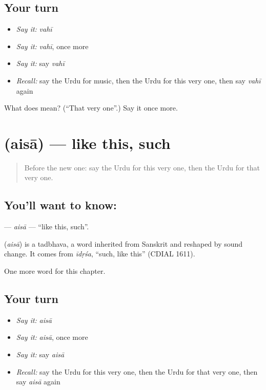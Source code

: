 \subsection*{Your turn}
\begin{itemize}
\raggedright
  \item \emph{Say it:} \emph{vahī}
  \item \emph{Say it:} \emph{vahī}, once more
  \item \emph{Say it:} say \emph{vahī}
  \item \emph{Recall:} say the Urdu for music, then the Urdu for this very one, then say \emph{vahī} again
\end{itemize}

\begin{tcolorbox}[breakable,colback=teal!4,colframe=teal!35!black,title={Before you move on}]
What does  mean? (\textquotedblleft{}That very one\textquotedblright{}.) Say it once more.
\end{tcolorbox}
\section[\texorpdfstring{\ur{ایسا} (aisā)}{ایسا (aisā)}]{ (aisā) — like this, such}

\label{lesson:UR-C88-aisa}



\begin{quote}
Before the new one: say the Urdu for this very one, then the Urdu for that very one.
\end{quote}

\subsection*{You'll want to know: }
\textbf{} — \emph{aisā} — \textquotedblleft{}like this, such\textquotedblright{}.

\begin{cousinweb}
\textbf{} (\emph{aisā}) is a tadbhava, a word inherited from Sanskrit and reshaped by sound change. It comes from \emph{īdṛśa}, \textquotedblleft{}such, like this\textquotedblright{} (CDIAL 1611).
\end{cousinweb}

\begin{grammarlens}[title={What you've built}]
One more word for this chapter.
\end{grammarlens}

\subsection*{Your turn}
\begin{itemize}
\raggedright
  \item \emph{Say it:} \emph{aisā}
  \item \emph{Say it:} \emph{aisā}, once more
  \item \emph{Say it:} say \emph{aisā}
  \item \emph{Recall:} say the Urdu for this very one, then the Urdu for that very one, then say \emph{aisā} again
\end{itemize}

